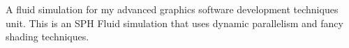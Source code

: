 A fluid simulation for my advanced graphics software development techniques unit. This is an S\-P\-H Fluid simulation that uses dynamic parallelism and fancy shading techniques. 